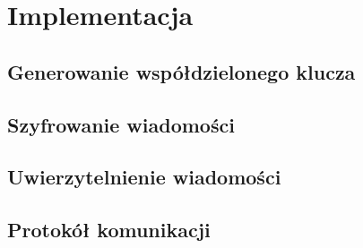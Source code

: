 \chapter{Implementacja}
\label{cha:implementacja}

\section{Generowanie współdzielonego klucza}
\label{sec:sharedkey}

\section{Szyfrowanie wiadomości}
\label{sec:encrypt}

\section{Uwierzytelnienie wiadomości}
\label{sec:auth}

\section{Protokół komunikacji}
\label{sec:proto}
